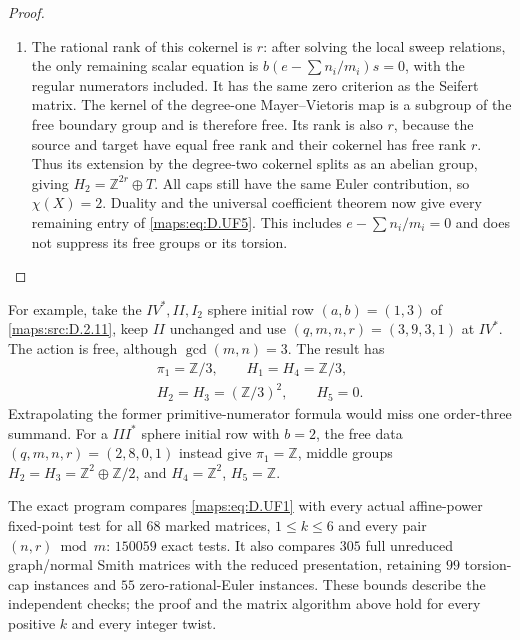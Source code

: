 \begin{proof}
\begin{enumerate}[label=\arabic*.,leftmargin=*]
\item The rational rank of this cokernel is $r$: after solving the
local sweep relations, the only remaining scalar equation is
$b(e-\sum n_i/m_i)s=0$, with the regular numerators included.
It has the same zero criterion as the Seifert matrix. The
kernel of the degree-one Mayer--Vietoris map is a subgroup
of the free boundary group and is therefore free. Its rank
is also $r$, because the source and target have equal free
rank and their cokernel has free rank $r$. Thus its extension
by the degree-two cokernel splits as an abelian group, giving
$H_2=\mathbb Z^{2r}\oplus T$. All caps still have the same
Euler contribution, so $\chi(X)=2$. Duality and the universal
coefficient theorem now give every remaining entry of \eqref{maps:eq:D.UF5}.
This includes $e-\sum n_i/m_i=0$ and does not suppress its
free groups or its torsion.
\end{enumerate}
\end{proof}

For example, take the $IV^*,II,I_2$ sphere initial row
$(a,b)=(1,3)$ of \ref{maps:src:D.2.11}, keep $II$ unchanged and use
$(q,m,n,r)=(3,9,3,1)$ at $IV^*$. The action is free, although
$\gcd(m,n)=3$. The result has
\[
\begin{gathered}
 \pi_1=\mathbb Z/3,\qquad H_1=H_4=\mathbb Z/3,\\
 H_2=H_3=(\mathbb Z/3)^2,\qquad H_5=0.
\end{gathered}
\]
Extrapolating the former primitive-numerator formula would
miss one order-three summand. For a $III^*$ sphere initial
row with $b=2$, the free data $(q,m,n,r)=(2,8,0,1)$ instead
give $\pi_1=\mathbb Z$, middle groups
$H_2=H_3=\mathbb Z^2\oplus\mathbb Z/2$, and
$H_4=\mathbb Z^2$, $H_5=\mathbb Z$.

The exact program
 compares
\eqref{maps:eq:D.UF1} with every actual affine-power fixed-point test for
all $68$ marked matrices, $1\le k\le6$ and every pair
$(n,r)\bmod m$: $150059$ exact tests. It also compares $305$
full unreduced graph/normal Smith matrices with the reduced
presentation, retaining $99$ torsion-cap instances and $55$
zero-rational-Euler instances. These bounds describe the
independent checks; the proof and the matrix algorithm above
hold for every positive $k$ and every integer twist.


